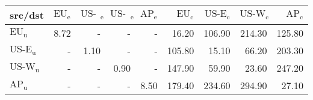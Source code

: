 \begin{tabular}{lrrrrrrrr}
\toprule
src/dst & $\text{EU}_\text{e}$ & $\text{US-E}_\text{e}$ & $\text{US-W}_\text{e}$ & $\text{AP}_\text{e}$ & $\text{EU}_\text{c}$ & $\text{US-E}_\text{c}$ & $\text{US-W}_\text{c}$ & $\text{AP}_\text{c}$ \\
\midrule
$\text{EU}_\text{u}$ & 8.72 & - & - & - & 16.20 & 106.90 & 214.30 & 125.80 \\
$\text{US-E}_\text{u}$ & - & 1.10 & - & - & 105.80 & 15.10 & 66.20 & 203.30 \\
$\text{US-W}_\text{u}$ & - & - & 0.90 & - & 147.90 & 59.90 & 23.60 & 247.20 \\
$\text{AP}_\text{u}$ & - & - & - & 8.50 & 179.40 & 234.60 & 294.90 & 27.10 \\
\bottomrule
\end{tabular}

